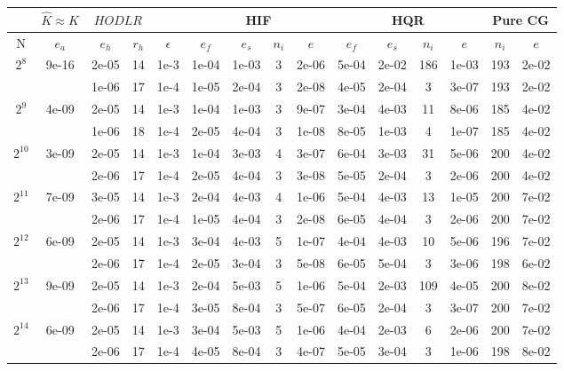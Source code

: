 \documentclass[11pt]{article}
\begin{document}
\begin{table}[!htbp]
\centering
\begin{tabular}{|c|c|c|c|c|c|c|c|c|c|c|c|c|c|c|}
\hline
\multicolumn{1}{c|}{} & \multicolumn{1}{c|}{$\hat{K} \approx K$} & \multicolumn{2}{c|}{$HODLR$} & \multicolumn{1}{c|}{} &\multicolumn{4}{c|}{HIF} & \multicolumn{4}{c|}{HQR} & \multicolumn{2}{c|}{Pure CG} \\
\hline
N & $e_{a}$ & $e_{h}$ & $r_{h}$ & $\epsilon$ & $e_{f}$ & $e_{s}$ & $n_{i}$ & $e$ & $e_{f}$  & $e_{s}$ & $n_{i}$ & $e$ &  $n_{i}$ & $e$ \\ 
\hline
$2^{8}$ & 9e-16 & 2e-05 & 14 & 1e-3 & 1e-04 & 1e-03 & 3 & 2e-06 & 5e-04 & 2e-02 & 186 & 1e-03 & 193 & 2e-02\\
~ & ~ & 1e-06 & 17 & 1e-4 & 1e-05 & 2e-04 & 3 & 2e-08 & 4e-05 & 2e-04 & 3 & 3e-07 & 193 & 2e-02\\
\hline
$2^{9}$ & 4e-09 & 2e-05 & 14 & 1e-3 & 1e-04 & 1e-03 & 3 & 9e-07 & 3e-04 & 4e-03 & 11 & 8e-06 & 185 & 4e-02\\
~ & ~ & 1e-06 & 18 & 1e-4 & 2e-05 & 4e-04 & 3 & 1e-08 & 8e-05 & 1e-03 & 4 & 1e-07 & 185 & 4e-02\\
\hline
$2^{10}$ & 3e-09 & 2e-05 & 14 & 1e-3 & 1e-04 & 3e-03 & 4 & 3e-07 & 6e-04 & 3e-03 & 31 & 5e-06 & 200 & 4e-02\\
~ & ~ & 2e-06 & 17 & 1e-4 & 2e-05 & 4e-04 & 3 & 3e-08 & 5e-05 & 2e-04 & 3 & 2e-06 & 200 & 4e-02\\
\hline
$2^{11}$ & 7e-09 & 3e-05 & 14 & 1e-3 & 2e-04 & 4e-03 & 4 & 1e-06 & 5e-04 & 4e-03 & 13 & 1e-05 & 200 & 7e-02\\
~ & ~ & 2e-06 & 17 & 1e-4 & 1e-05 & 4e-04 & 3 & 2e-08 & 6e-05 & 4e-04 & 3 & 2e-06 & 200 & 7e-02\\
\hline
$2^{12}$ & 6e-09 & 2e-05 & 14 & 1e-3 & 3e-04 & 4e-03 & 5 & 1e-07 & 4e-04 & 4e-03 & 10 & 5e-06 & 196 & 7e-02\\
~ & ~ & 2e-06 & 17 & 1e-4 & 2e-05 & 3e-04 & 3 & 5e-08 & 6e-05 & 5e-04 & 3 & 3e-06 & 198 & 6e-02\\
\hline
$2^{13}$ & 9e-09 & 2e-05 & 14 & 1e-3 & 2e-04 & 5e-03 & 5 & 1e-06 & 5e-04 & 2e-03 & 109 & 4e-05 & 200 & 8e-02\\
~ & ~ & 2e-06 & 17 & 1e-4 & 3e-05 & 8e-04 & 3 & 5e-07 & 6e-05 & 2e-04 & 3 & 3e-07 & 200 & 7e-02\\
\hline
$2^{14}$ & 6e-09 & 2e-05 & 14 & 1e-3 & 3e-04 & 5e-03 & 5 & 1e-06 & 4e-04 & 2e-03 & 6 & 2e-06 & 200 & 7e-02\\
~ & ~ & 2e-06 & 17 & 1e-4 & 4e-05 & 8e-04 & 3 & 4e-07 & 5e-05 & 3e-04 & 3 & 1e-06 & 198 & 8e-02\\

\end{tabular}
\end{table}
\end{document}
